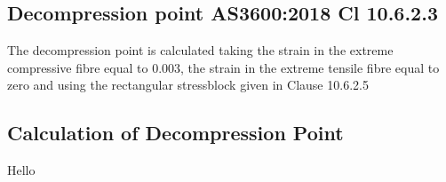 \documentclass{article}%
\begin{document}
\subsection*{Decompression point AS3600:2018 Cl 10.6.2.3}%
\label{subsec:DecompressionpointAS36002018Cl10.6.2.3}%
The decompression point is calculated taking the strain in the extreme compressive fibre equal to 0.003, the strain in the extreme tensile fibre equal to zero and using the rectangular stressblock given in Clause 10.6.2.5

%
\subsection*{Calculation of Decompression Point}%
\label{subsec:CalculationofDecompressionPoint}%
Hello

%
\end{document}
